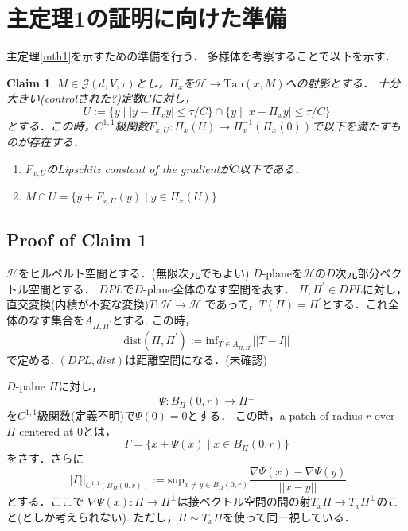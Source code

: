\documentclass{ujarticle}
\newtheorem{clm}{Claim}
\newcommand{\bpd}{B_{\Pi}(0,r)}
\newcommand{\gnd}{||\Gamma||_{C^{1,1}(\bpd)}}
\newcommand{\gdvt}{\mathcal{G}(d,V,\tau)}
\begin{document}
\section{主定理1の証明に向けた準備}
\label{sub:主定理の証明に向けた準備}
主定理\ref{mth1}を示すための準備を行う．
多様体を考察することで以下を示す．
\begin{clm}
  $M \in \gdvt$とし，$\Pi_x$を$\mathcal{H} \to \mathrm{Tan}(x,M)$への射影とする．
  十分大きい(controlされた?)定数$C$に対し，
  \begin{equation*}
   U:= \{ y \mid |y - \Pi_xy| \le \tau/C \} \cap \{ y \mid |x - \Pi_x y| \le \tau/C \}
  \end{equation*}
  とする．この時，$C^{1,1}$級関数$F_{x,U}:\Pi_x(U) \to \Pi_x^{-1}(\Pi_x(0))$で以下を満たすものが存在する．
  \begin{enumerate}
    \item $F_{x,U}$のLipschitz constant of the gradientが$C$以下である．
    \item $ \displaystyle
    M \cap U = \{ y + F_{x,U}(y) \mid y \in \Pi_x(U) \} $
  \end{enumerate}
\end{clm}

\subsection{Proof of Claim 1}
\label{sec:Proof of CLAIM 1}

$\mathcal{H}$をヒルベルト空間とする．(無限次元でもよい)
$D$-planeを$\mathcal{H}$の$D$次元部分ベクトル空間とする．
$DPL$で$D$-plane全体のなす空間を表す．
$\Pi,\Pi^\prime \in DPL$に対し，直交変換(内積が不変な変換)$T: \mathcal{H} \to \mathcal{H}$
であって，$T(\Pi)= \Pi^\prime$とする．これ全体のなす集合を$A_{\Pi,\Pi^\prime}$とする.
この時，
\begin{equation*}
 \mathrm{dist} (\Pi,\Pi^\prime):= \mathrm{inf}_{T \in A_{\Pi,\Pi^\prime}} ||T -I||
\end{equation*}
で定める.
$(DPL,dist)$は距離空間になる．(未確認)


$D$-palne $\Pi$に対し，
\begin{equation*}
 \Psi :\bpd \to \Pi^{\perp}
\end{equation*}
を$C^{1,1}$級関数(定義不明)で$\Psi(0)=0$とする．
この時，a patch of radius $r$ over $\Pi$ centered at 0とは，
\begin{equation*}
 \Gamma=\{ x + \Psi(x) \mid x \in \bpd \}
\end{equation*}
をさす．さらに
\begin{equation*}
 \gnd := \mathrm{sup}_{x \neq y \in \bpd} \frac{ \nabla \Psi(x) - \nabla \Psi(y)}{||x - y||}
\end{equation*}
とする．ここで
$\nabla\Psi(x):\Pi \to \Pi^{\perp}$は接ベクトル空間の間の射$T_x\Pi \to T_x\Pi^{\perp}$のこと(としか考えられない).
ただし，$\Pi \sim T_x \Pi$を使って同一視している．
\end{document}
